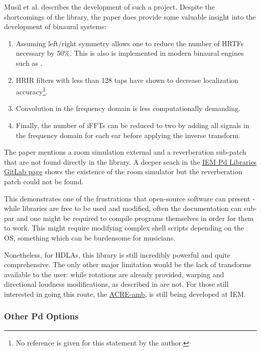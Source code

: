 Musil et al. \cite{musil2005library} describes the development of such a project. Despite the shortcomings of the library, the paper does provide some valuable insight into the development of binaural systems:

\begin{enumerate}
    \item Assuming left/right symmetry allows one to reduce the number of HRTFs necessary by 50\%. This is also is implemented in modern binaural engines such as \cite{gorzel2019efficient}.
    \item HRIR filters with less than 128 taps have shown to decrease localization accuracy\footnote{No reference is given for this statement by the author.}. 
    \item Convolution in the frequency domain is less computationally demanding.
    \item Finally, the number of iFFTs can be reduced to two by adding all signals in the frequency domain for each ear before applying the inverse transform.
\end{enumerate}

The paper mentions a room simulation external and a reverberation sub-patch that are not found directly in the library. A deeper seach in the \href{https://git.iem.at/pd}{IEM Pd Libraries GitLab page} shows the existence of the room simulator but the reverberation patch could not be found. 

This demonstrates one of the frustrations that open-source software can present - while libraries are free to be used and modified, often the documentation can sub-par and one might be required to compile programs themselves in order for them to work. This might require modifying complex shell scripts depending on the OS, something which can be burdensome for musicians.

Nonetheless, for HDLAs, this library is still incredibly powerful and quite comprehensive. The only other major limitation would be the lack of transforms available to the user: while rotations are already provided, warping and directional loudness modifications, as described in \cite{kronlachner2014spatial} are not. For those still interested in going this route, the \href{https://git.iem.at/pd/acre-amb}{ACRE-amb}, is still being developed at IEM. 

\subsubsection{Other Pd Options}

